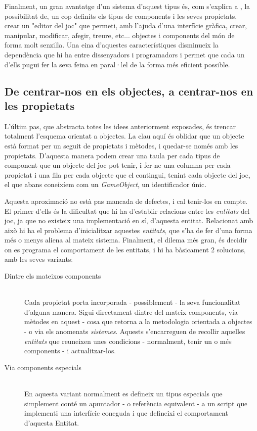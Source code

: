 Finalment, un gran avantatge d'un sistema d'aquest tipus és, com s'explica a \cite{Leonard99}, la possibilitat de, un cop definits els tipus de components i les seves propietats, crear un "editor del joc" que permeti, amb l'ajuda d'una interfície gràfica, crear, manipular, modificar, afegir, treure, etc... objectes i components del món de forma molt senzilla. Una eina d'aquestes característiques disminueix la dependència que hi ha entre dissenyadors i programadors i permet que cada un d'ells pugui fer la seva feina en paral·lel de la forma més eficient possible.

\subsection{De centrar-nos en els objectes, a centrar-nos en les propietats}

L'últim pas, que abstracta totes les idees anteriorment exposades, és trencar totalment l'esquema orientat a objectes. La clau aquí és oblidar que un objecte està format per un seguit de propietats i mètodes, i quedar-se només amb les propietats. D'aquesta manera podem crear una taula per cada tipus de component que un objecte del joc pot tenir, i fer-ne una columna per cada propietat i una fila per cada objecte que el contingui, tenint cada objecte del joc, el que abans coneixíem com un {\em GameObject}, un identificador únic.

Aquesta aproximació no està pas mancada de defectes, i cal tenir-los en compte. El primer d'ells és la dificultat que hi ha d'establir relacions entre les {\em entitats} del joc, ja que no existeix una implementació en sí, d'aquesta entitat. Relacionat amb això hi ha el problema d'inicialitzar aquestes {\em entitats}, que s'ha de fer d'una forma més o menys aliena al mateix sistema. Finalment, el dilema més gran, és decidir on es programa el comportament de les entitats, i hi ha bàsicament 2 solucions, amb les seves variants:

\begin{description}
  \item[Dintre els mateixos components] \hfill \\
    Cada propietat porta incorporada - possiblement - la seva funcionalitat d'alguna manera. Sigui directament dintre del mateix components, via mètodes en aquest - cosa que retorna a la metodologia orientada a objectes - o via els anomenats {\em sistemes}. Aquests s'encarreguen de recollir aquelles {\em entitats} que reuneixen unes condicions - normalment, tenir un o més components - i actualitzar-los.
    
  \item[Via components especials] \hfill \\
    En aquesta variant normalment es defineix un tipus especials que simplement conté un apuntador - o referència equivalent - a un script que implementi una interfície coneguda i que defineixi el comportament d'aquesta Entitat.
    
\end{description}



